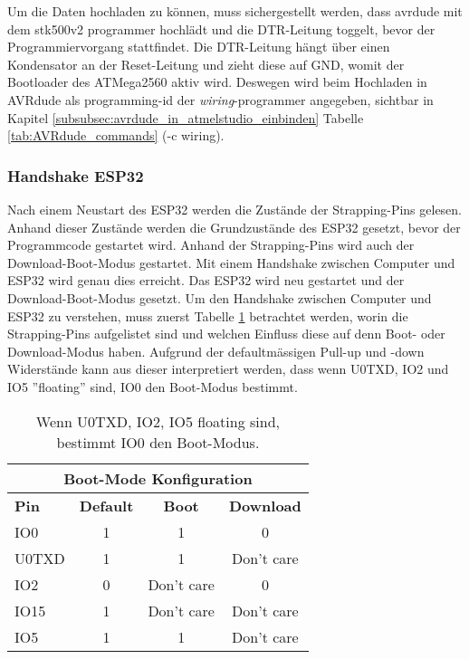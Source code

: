 Um die Daten hochladen zu können, muss sichergestellt werden, dass avrdude mit dem stk500v2 programmer hochlädt und die DTR-Leitung toggelt, bevor der Programmiervorgang stattfindet. Die DTR-Leitung hängt über einen Kondensator an der Reset-Leitung und zieht diese auf GND, womit der Bootloader des ATMega2560 aktiv wird. Deswegen wird beim Hochladen in AVRdude als programming-id der \textit{wiring}-programmer angegeben, sichtbar in Kapitel \ref{subsubsec:avrdude_in_atmelstudio_einbinden} Tabelle \ref{tab:AVRdude_commands} (-c wiring).

\subsubsection{Handshake ESP32}\label{subsubsec:Handshake_ESP32}
Nach einem Neustart des ESP32 werden die Zustände der Strapping-Pins gelesen. Anhand dieser Zustände werden die Grundzustände des ESP32 gesetzt, bevor der Programmcode gestartet wird. Anhand der Strapping-Pins wird auch der Download-Boot-Modus gestartet. Mit einem Handshake zwischen Computer und ESP32 wird genau dies erreicht. Das ESP32 wird neu gestartet und der Download-Boot-Modus gesetzt.
Um den Handshake zwischen Computer und ESP32 zu verstehen, muss zuerst Tabelle \ref{tab:Einfluss_Pins_auf_Boot_Modus} betrachtet werden, worin die Strapping-Pins aufgelistet sind und welchen Einfluss diese auf denn Boot- oder Download-Modus haben. Aufgrund der defaultmässigen Pull-up und -down Widerstände kann aus dieser interpretiert werden, dass wenn U0TXD, IO2 und IO5 ''floating'' sind, IO0 den Boot-Modus bestimmt.

\begin{table}[H]
\center
\begin{tabular}{|l|c|c|c|}
\hline
\multicolumn{4}{|c|}{\textbf{Boot-Mode Konfiguration}}\\
\hline
\textbf{Pin} & \textbf{Default} & \textbf{Boot} & \textbf{Download} \\
\hline
IO0 & 1 & 1 & 0 \\
\hline
U0TXD & 1 & 1 & Don't care \\
\hline
IO2 & 0 & Don't care & 0 \\
\hline
IO15 & 1 & Don't care & Don't care \\
\hline
IO5 & 1 & 1 & Don't care \\
\hline
\end{tabular}
\caption{Wenn U0TXD, IO2, IO5 floating sind, bestimmt IO0 den Boot-Modus.}
\label{tab:Einfluss_Pins_auf_Boot_Modus}
\end{table}

